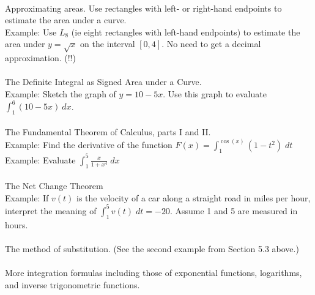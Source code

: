 \documentclass[11pt,fleqn]{article}
\begin{document}
\noindent {}\\
Approximating areas. Use rectangles with left- or right-hand endpoints to estimate the area under a curve.\\ 

Example: Use $L_8$ (ie eight rectangles with left-hand endpoints) to estimate the area under $y=\sqrt{x}$ on the interval $[0,4].$ No need to get a decimal approximation. (!!)\\


\noindent {}\\
The Definite Integral as Signed Area under a Curve.\\

Example: Sketch the graph of $y=10 - 5x.$ Use this graph to evaluate $\int_{1}^6 (10-5x) \:dx$.\\

\noindent {}\\
The Fundamental Theorem of Calculus, parts I and II.\\

Example: Find the derivative of the function $F(x)=\int_1^{\cos(x)} (1-t^2) \; dt$\\

Example: Evaluate $\int_1^5 \frac{x}{1+x^4} \; dx$\\

\noindent {}\\
The Net Change Theorem\\

Example: If $v(t)$ is the velocity of a car along a straight road in miles per hour, interpret the meaning of $\int_1^5 v(t) \; dt = -20.$ Assume 1 and 5 are measured in hours. \\

\noindent {}\\
The method of substitution. (See the second example from Section 5.3 above.)\\

\noindent {}\\
More integration formulas including those of exponential functions, logarithms, and inverse trigonometric functions.
\end{document}
